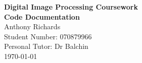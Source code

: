 \documentclass[a4paper]{article}
\begin{document}
\hypersetup{pageanchor=false,citecolor=blue}
\begin{titlepage}
\centering
  \vspace*{11\baselineskip}
  \linespread{1.1}
  \large
  \textbf{
  Digital Image Processing Coursework\\
  Code Documentation\\
  }
  \normalfont
  \small
  Anthony Richards\\
  Student Number: 070879966\\
  Personal Tutor: Dr Balchin\\
  \today
\end{titlepage}
{
  \setlength{\parskip}{0ex plus 0.5ex minus 0.2ex}
  \tableofcontents
}
\cleardoublepage
{}
\hypersetup{pageanchor=true,citecolor=blue}
\end{document}
